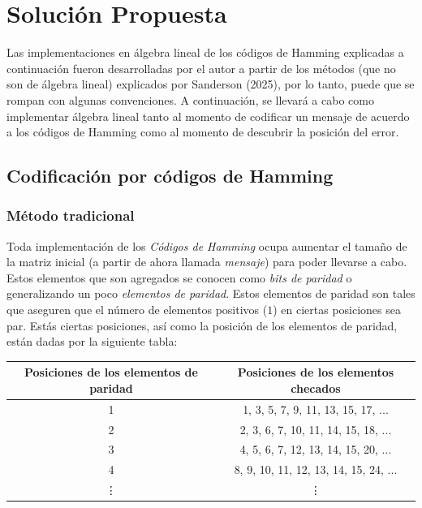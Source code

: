 \documentclass{article}
\begin{document}
\section{Solución Propuesta}

Las implementaciones en álgebra lineal de los códigos de Hamming explicadas a continuación fueron desarrolladas por el autor a partir de los métodos (que no son de álgebra lineal) explicados por Sanderson (2025), por lo tanto, puede que se rompan con algunas convenciones. A continuación, se llevará a cabo como implementar álgebra lineal tanto al momento de codificar un mensaje de acuerdo a los códigos de Hamming como al momento de descubrir la posición del error.

\subsection{Codificación por códigos de Hamming}

\subsubsection{Método tradicional}

Toda implementación de los \textit{Códigos de Hamming} ocupa aumentar el tamaño de la matriz inicial (a partir de ahora llamada \textit{mensaje}) para poder llevarse a cabo. Estos elementos que son agregados se conocen como \textit{bits de paridad} o generalizando un poco \textit{elementos de paridad}. Estos elementos de paridad son tales que aseguren que el número de elementos positivos ($1$) en ciertas posiciones sea par. Estás ciertas posiciones, así como la posición de los elementos de paridad, están dadas por la siguiente tabla:

\begin{center}
\begin{tabular}{ |c|c| } 
 \hline
 Posiciones de los elementos de paridad & Posiciones de los elementos checados \\ 
 \hline
 1 & 1, 3, 5, 7, 9, 11, 13, 15, 17, ... \\ 
 2 & 2, 3, 6, 7, 10, 11, 14, 15, 18, ... \\ 
 3 & 4, 5, 6, 7, 12, 13, 14, 15, 20, ... \\
 4 & 8, 9, 10, 11, 12, 13, 14, 15, 24, ...\\
 \vdots & \vdots \\
 \hline
\end{tabular}
\end{center}
\end{document}

